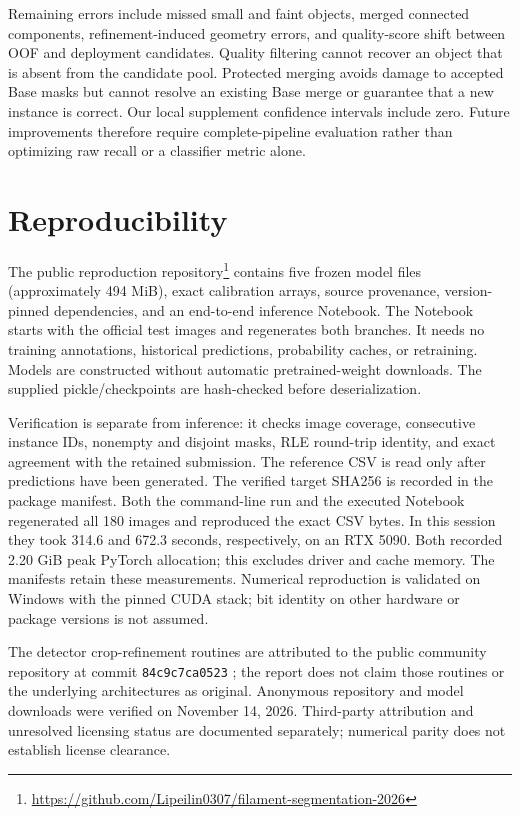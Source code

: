 \documentclass[sigconf]{acmart}
\begin{document}
Remaining errors include missed small and faint objects, merged connected components, refinement-induced geometry errors, and quality-score shift between OOF and deployment candidates. Quality filtering cannot recover an object that is absent from the candidate pool. Protected merging avoids damage to accepted Base masks but cannot resolve an existing Base merge or guarantee that a new instance is correct. Our local supplement confidence intervals include zero. Future improvements therefore require complete-pipeline evaluation rather than optimizing raw recall or a classifier metric alone.

\clearpage
\balance
\section{Reproducibility}
The public reproduction repository\footnote{\url{https://github.com/Lipeilin0307/filament-segmentation-2026}} contains five frozen model files (approximately 494 MiB), exact calibration arrays, source provenance, version-pinned dependencies, and an end-to-end inference Notebook. The Notebook starts with the official test images and regenerates both branches. It needs no training annotations, historical predictions, probability caches, or retraining. Models are constructed without automatic pretrained-weight downloads. The supplied pickle/checkpoints are hash-checked before deserialization.

Verification is separate from inference: it checks image coverage, consecutive instance IDs, nonempty and disjoint masks, RLE round-trip identity, and exact agreement with the retained submission. The reference CSV is read only after predictions have been generated. The verified target SHA256 is recorded in the package manifest. Both the command-line run and the executed Notebook regenerated all 180 images and reproduced the exact CSV bytes. In this session they took 314.6 and 672.3 seconds, respectively, on an RTX 5090. Both recorded 2.20 GiB peak PyTorch allocation; this excludes driver and cache memory. The manifests retain these measurements. Numerical reproduction is validated on Windows with the pinned CUDA stack; bit identity on other hardware or package versions is not assumed.

The detector crop-refinement routines are attributed to the public community repository at commit \texttt{84c9c7ca0523} \cite{community}; the report does not claim those routines or the underlying architectures as original. Anonymous repository and model downloads were verified on November 14, 2026. Third-party attribution and unresolved licensing status are documented separately; numerical parity does not establish license clearance.
\end{document}
